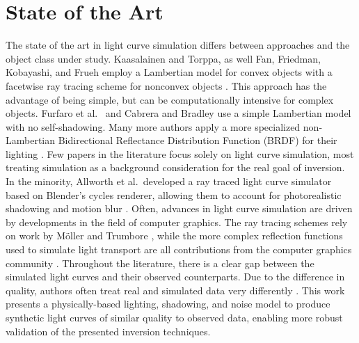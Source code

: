 \section{State of the Art}

The state of the art in light curve simulation differs between approaches and the object class under study. Kaasalainen and Torppa, as well Fan, Friedman, Kobayashi, and Frueh employ a Lambertian model for convex objects with a facetwise ray tracing scheme for nonconvex objects \cite{kaasalainen2001, fan2016, fan2020thesis,friedman2020,kobayashi2020,frueh2014}. This approach has the advantage of being simple, but can be computationally intensive for complex objects. Furfaro et al.\ \cite{furfaro2019} and Cabrera and Bradley \cite{cabrera2021,bradley2014} use a simple Lambertian model with no self-shadowing. Many more authors apply a more specialized non-Lambertian Bidirectional Reflectance Distribution Function (BRDF) for their lighting \cite{linares2018space, mcnally2021, blacketer2022}. Few papers in the literature focus solely on light curve simulation, most treating simulation as a background consideration for the real goal of inversion. In the minority, Allworth et al.\ developed a ray traced light curve simulator based on Blender's cycles renderer, allowing them to account for photorealistic shadowing and motion blur \cite{allworth2020, allworth2021}. Often, advances in light curve simulation are driven by developments in the field of computer graphics. The ray tracing schemes rely on work by Möller and Trumbore \cite{moller2005}, while the more complex reflection functions used to simulate light transport are all contributions from the computer graphics community \cite{phong1975, ashikhmin2000, cook1982, oren1994, matusik2003}. Throughout the literature, there is a clear gap between the simulated light curves and their observed counterparts. Due to the difference in quality, authors often treat real and simulated data very differently \cite{allworth2021}. This work presents a physically-based lighting, shadowing, and noise model to produce synthetic light curves of similar quality to observed data, enabling more robust validation of the presented inversion techniques.

